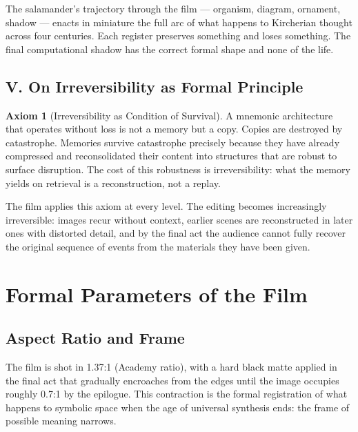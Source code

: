 \documentclass[12pt, a4paper, twoside]{memoir}
\theoremstyle{definition}
\newtheorem{axiom}{Axiom}[chapter]
\theoremstyle{remark}
\begin{document}
The salamander's trajectory through the film --- organism, diagram, ornament, shadow --- enacts in miniature the full arc of what happens to Kircherian thought across four centuries. Each register preserves something and loses something. The final computational shadow has the correct formal shape and none of the life.

\section*{V. On Irreversibility as Formal Principle}

\begin{axiom}[Irreversibility as Condition of Survival]
A mnemonic architecture that operates without loss is not a memory but a copy. Copies are destroyed by catastrophe. Memories survive catastrophe precisely because they have already compressed and reconsolidated their content into structures that are robust to surface disruption. The cost of this robustness is irreversibility: what the memory yields on retrieval is a reconstruction, not a replay.
\end{axiom}

The film applies this axiom at every level. The editing becomes increasingly irreversible: images recur without context, earlier scenes are reconstructed in later ones with distorted detail, and by the final act the audience cannot fully recover the original sequence of events from the materials they have been given.

\clearpage

\chapter*{Formal Parameters of the Film}

\section*{Aspect Ratio and Frame}

The film is shot in 1.37:1 (Academy ratio), with a hard black matte applied in the final act that gradually encroaches from the edges until the image occupies roughly 0.7:1 by the epilogue. This contraction is the formal registration of what happens to symbolic space when the age of universal synthesis ends: the frame of possible meaning narrows.
\end{document}
